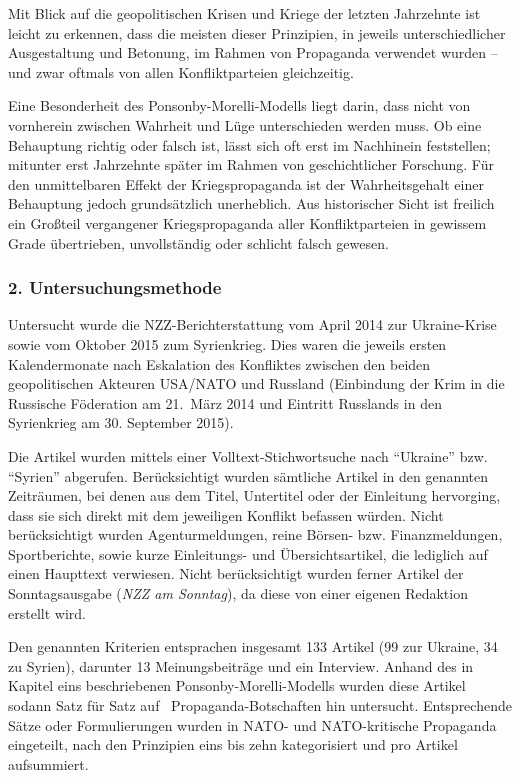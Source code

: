 Mit Blick auf die geopolitischen Krisen und Kriege der letzten
Jahrzehnte ist leicht zu erkennen, dass die meisten dieser Prinzipien,
in jeweils unterschiedlicher Ausgestaltung und Betonung, im Rahmen von
Propaganda verwendet wurden -- und zwar oftmals von allen
Konfliktparteien gleichzeitig.

Eine Besonderheit des Ponsonby-Morelli-Modells liegt darin, dass nicht
von vornherein zwischen Wahrheit und Lüge unterschieden werden muss. Ob
eine Behauptung richtig oder falsch ist, lässt sich oft erst im
Nachhinein feststellen; mitunter erst Jahrzehnte später im Rahmen von
geschichtlicher Forschung. Für den unmittelbaren Effekt der
Kriegspropaganda ist der Wahrheitsgehalt einer Behauptung jedoch
grundsätzlich unerheblich. Aus historischer Sicht ist freilich ein
Großteil vergangener Kriegspropaganda aller Konfliktparteien in gewissem
Grade übertrieben, unvollständig oder schlicht falsch gewesen.

\hypertarget{2-untersuchungsmethode}{%
\subsubsection{2. Untersuchungsmethode}\label{2-untersuchungsmethode}}

Untersucht wurde die NZZ-Berichterstattung vom April 2014 zur
Ukraine-Krise sowie vom Oktober 2015 zum Syrienkrieg. Dies waren die
jeweils ersten Kalendermonate nach Eskalation des Konfliktes zwischen
den beiden geopolitischen Akteuren USA/NATO und Russland (Einbindung der
Krim in die Russische Föderation am 21.~März 2014 und Eintritt Russlands
in den Syrienkrieg am 30. September 2015).

Die Artikel wurden mittels einer Volltext-Stichwortsuche nach
``Ukraine'' bzw. ``Syrien'' abgerufen. Berücksichtigt wurden sämtliche
Artikel in den genannten Zeiträumen, bei denen aus dem Titel, Untertitel
oder der Einleitung hervorging, dass sie sich direkt mit dem jeweiligen
Konflikt befassen würden. Nicht berücksichtigt wurden Agenturmeldungen,
reine Börsen- bzw. Finanzmeldungen, Sportberichte, sowie kurze
Einleitungs- und Übersichtsartikel, die lediglich auf einen Haupttext
verwiesen. Nicht berücksichtigt wurden ferner Artikel der
Sonntags­ausgabe (\emph{NZZ am Sonntag}), da diese von einer eigenen
Redaktion erstellt wird.

Den genannten Kriterien entsprachen insgesamt 133 Artikel (99 zur
Ukraine, 34 zu Syrien), darunter 13 Meinungs­beiträge und ein Interview.
Anhand des in Kapitel eins beschriebenen Ponsonby-Morelli-Modells wurden
diese Artikel sodann Satz für Satz auf~ Propaganda-Botschaften hin
untersucht. Entsprechende Sätze oder Formulierungen wurden in NATO- und
NATO-kritische Propaganda eingeteilt, nach den Prinzipien eins bis zehn
kategorisiert und pro Artikel aufsummiert.

